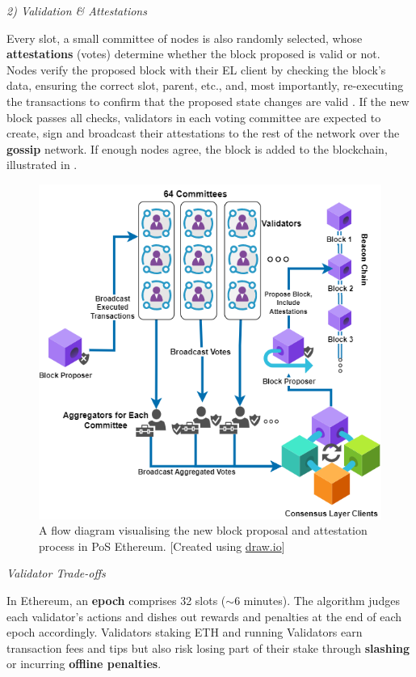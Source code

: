 \textit{2) Validation \& Attestations}
\label{AttestationsLitRev}

Every slot, a small committee of nodes is also randomly selected, whose \textbf{attestations} (votes) determine whether the block proposed is valid or not. Nodes verify the proposed block with their EL client by checking the block's data, ensuring the correct slot, parent, etc., and, most importantly, re-executing the transactions to confirm that the proposed state changes are valid \cite{EthereumEthereum.org}. If the new block passes all checks, validators in each voting committee are expected to create, sign and broadcast their attestations to the rest of the network over the \textbf{gossip} network. If enough nodes agree, the block is added to the blockchain,  illustrated in . 

\begin{figure}[!htb]
    \centering
    \includegraphics[width=13cm,center]{Figures/AttestationsDiragram.png}
    \caption{A flow diagram visualising the new block proposal and attestation process in PoS Ethereum. [Created using \url{draw.io}]}
    \label{Figure:AttestationsDiragram}
\end{figure}

\textit{Validator Trade-offs}

In Ethereum, an \textbf{epoch} comprises 32 slots ($\sim$6 minutes). The algorithm judges each validator's actions and dishes out rewards and penalties at the end of each epoch accordingly. Validators staking ETH and running Validators earn transaction fees and tips but also risk losing part of their stake through \textbf{slashing} or incurring \textbf{offline penalties}.

